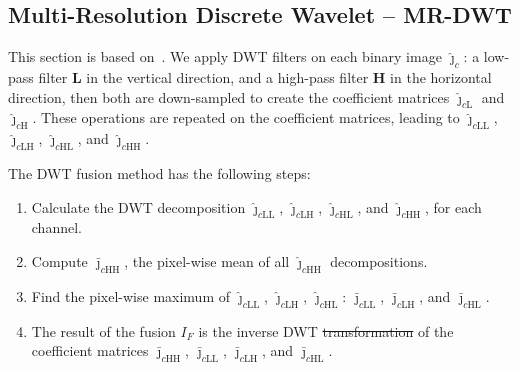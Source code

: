 \documentclass[journal]{IEEEtran}
\providecommand{\DIFadd}[1]{{\protect\color{blue}\uwave{#1}}} %
\providecommand{\DIFdel}[1]{{\protect\color{red}\sout{#1}}}                      %
\providecommand{\DIFaddbegin}{} %
\providecommand{\DIFaddend}{} %
\providecommand{\DIFdelbegin}{} %
\providecommand{\DIFdelend}{} %
\newcommand{\DIFscaledelfig}{0.5}
\newlength{\DIFdelgraphicswidth} %
\newlength{\DIFdelgraphicsheight} %
\newcommand{\DIFaddincludegraphics}[2][]{{\color{blue}\fbox{\DIFOincludegraphics[#1]{#2}}}} %
\newcommand{\DIFdelincludegraphics}[2][]{%
\sbox{\DIFdelgraphicsbox}{\DIFOincludegraphics[#1]{#2}}%
\settoboxwidth{\DIFdelgraphicswidth}{\DIFdelgraphicsbox} %
\settoboxtotalheight{\DIFdelgraphicsheight}{\DIFdelgraphicsbox} %
\scalebox{\DIFscaledelfig}{%
\parbox[b]{\DIFdelgraphicswidth}{\usebox{\DIFdelgraphicsbox}\\[-\baselineskip] \rule{\DIFdelgraphicswidth}{0em}}\llap{\resizebox{\DIFdelgraphicswidth}{\DIFdelgraphicsheight}{%
\setlength{\unitlength}{\DIFdelgraphicswidth}%
\begin{picture}(1,1)%
\thicklines\linethickness{2pt} %
{\color[rgb]{1,0,0}\put(0,0){\framebox(1,1){}}}%
{\color[rgb]{1,0,0}\put(0,0){\line( 1,1){1}}}%
{\color[rgb]{1,0,0}\put(0,1){\line(1,-1){1}}}%
\end{picture}%
}\hspace*{3pt}}} %
} %
\DeclareRobustCommand{\DIFaddbegin}{\DIFOaddbegin \let\includegraphics\DIFaddincludegraphics} %
\DeclareRobustCommand{\DIFaddend}{\DIFOaddend \let\includegraphics\DIFOincludegraphics} %
\DeclareRobustCommand{\DIFdelbegin}{\DIFOdelbegin \let\includegraphics\DIFdelincludegraphics} %
\DeclareRobustCommand{\DIFdelend}{\DIFOaddend \let\includegraphics\DIFOincludegraphics} %
\begin{document}
\subsection{Multi-Resolution Discrete Wavelet -- MR-DWT} 
This section is based on~\cite{n_r}.
We apply DWT filters on each binary image $\bm{\widehat\jmath}_c$: a low-pass filter $\bm L$ in the vertical direction, and a high-pass filter $\bm H$ in the horizontal direction, then both are down-sampled to create the coefficient matrices $\bm{\widehat\jmath}_{c\text{L}}$ and $\bm{\widehat\jmath}_{c\text{H}}$.
These operations are repeated on the coefficient matrices, leading to $\bm{\widehat\jmath}_{c\text{LL}}$, $\bm{\widehat\jmath}_{c\text{LH}}$, $\bm{\widehat\jmath}_{c\text{HL}}$, and $\bm{\widehat\jmath}_{c\text{HH}}$.

The DWT fusion method has the following steps:
\begin{enumerate}
\item Calculate the DWT decomposition $\bm{\widehat\jmath}_{c\text{LL}}$, $\bm{\widehat\jmath}_{c\text{LH}}$, $\bm{\widehat\jmath}_{c\text{HL}}$, and $\bm{\widehat\jmath}_{c\text{HH}}$, for each channel.
\item Compute $\bm{\bar\jmath}_{c\text{HH}}$, the pixel-wise mean of all $\bm{\widehat\jmath}_{c\text{HH}}$ decompositions.
\item Find the pixel-wise maximum of $\bm{\widehat\jmath}_{c\text{LL}}$, $\bm{\widehat\jmath}_{c\text{LH}}$, $\bm{\widehat\jmath}_{c\text{HL}}$: $\bm{\bar\jmath}_{c\text{LL}}$, $\bm{\bar\jmath}_{c\text{LH}}$, and $\bm{\bar\jmath}_{c\text{HL}}$.
\item The result of the fusion $I_F$ is the inverse DWT \DIFdelbegin \DIFdel{transformation }\DIFdelend \DIFaddbegin \DIFadd{transform }\DIFaddend of the coefficient matrices $\bm{\bar\jmath}_{c\text{HH}}$, $\bm{\bar\jmath}_{c\text{LL}}$, $\bm{\bar\jmath}_{c\text{LH}}$, and $\bm{\bar\jmath}_{c\text{HL}}$.
\end{enumerate}
\end{document}

